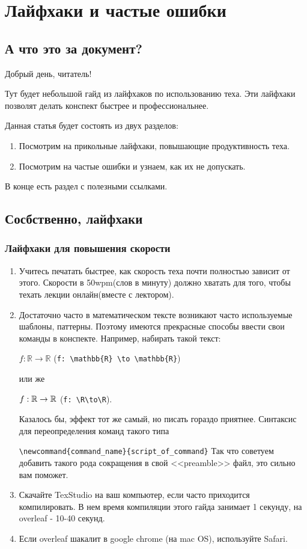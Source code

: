 \section{Лайфхаки и частые ошибки}
\subsection{А что это за документ?}

Добрый день, читатель!

Тут будет небольшой гайд из лайфхаков по использованию теха. Эти лайфхаки позволят делать конспект быстрее и профессиональнее. 


Данная статья будет состоять из двух разделов:
\begin{enumerate}
	\item Посмотрим на прикольные лайфхаки, повышающие продуктивность теха. 
	\item Посмотрим на частые ошибки и узнаем, как их не допускать.
\end{enumerate}

В конце есть раздел с полезными ссылками.

\subsection{Сосбственно, лайфхаки}

\subsubsection{Лайфхаки для повышения скорости}
\begin{enumerate}
	\item Учитесь печатать быстрее, как скорость теха почти полностью зависит от этого. Скорости в 50wpm(слов в минуту) должно хватать для того, чтобы техать лекции онлайн(вместе с лектором).
	
	\item Достаточно часто в математическом тексте возникают часто используемые шаблоны, паттерны. Поэтому имеются прекрасные способы ввести свои команды в конспекте. Например, набирать такой текст: 
	
	$f: \mathbb{R} \to \mathbb{R}$ (\verb|f: \mathbb{R} \to \mathbb{R}|) 
	
	или же
	
	$f: \mathbb{R}\to\mathbb{R}$ (\verb|f: \R\to\R|).
	
	Казалось бы, эффект тот же самый, но писать гораздо приятнее. 
	Синтаксис для переопределения команд такого типа  
	
	\verb|\newcommand{command_name}{script_of_command}|
	Так что советуем добавить такого рода сокращения в свой <<preamble>> файл, это сильно вам поможет. 
	
	\item Скачайте TexStudio на ваш компьютер, если часто приходится компилировать. 
	В нем время компиляции этого гайда занимает 1 секунду, на overleaf - 10-40 секунд.
	
	\item Если overleaf шакалит в google chrome (на mac OS), используйте Safari. 
\end{enumerate}


